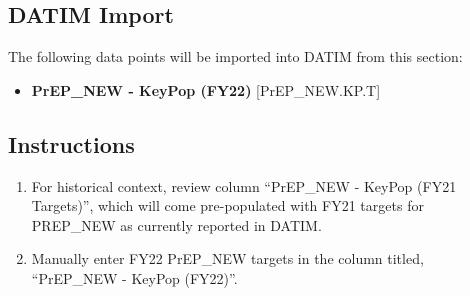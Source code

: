 \documentclass[
  openany]{book}
\providecommand{\tightlist}{%
  \setlength{\itemsep}{0pt}\setlength{\parskip}{0pt}}
\begin{document}
\begin{table}[H]
\centering\begingroup\fontsize{12}{14}\selectfont

\endgroup{}
\end{table}

\hypertarget{datim-import-45}{%
\subsection{DATIM Import}\label{datim-import-45}}

The following data points will be imported into DATIM from this section:

\begin{itemize}
\tightlist
\item
  \textbf{PrEP\_NEW - KeyPop (FY22)} {[}PrEP\_NEW.KP.T{]}
\end{itemize}

\hypertarget{instructions-45}{%
\subsection{Instructions}\label{instructions-45}}

\begin{enumerate}
\def\labelenumi{\arabic{enumi}.}
\item
  For historical context, review column ``PrEP\_NEW - KeyPop (FY21
  Targets)'', which will come pre-populated with FY21 targets for
  PREP\_NEW as currently reported in DATIM.
\item
  Manually enter FY22 PrEP\_NEW targets in the column titled,
  ``PrEP\_NEW - KeyPop (FY22)''.
\end{enumerate}
\end{document}
